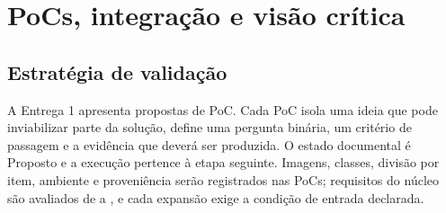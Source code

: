 \chapter{PoCs, integração e visão crítica}

\section{Estratégia de validação}
A Entrega 1 apresenta propostas de PoC. Cada PoC isola uma ideia que pode inviabilizar parte da solução, define uma pergunta binária, um critério de passagem e a evidência que deverá ser produzida. O estado documental é Proposto e a execução pertence à etapa seguinte. Imagens, classes, divisão por item, ambiente e proveniência serão registrados nas PoCs; requisitos do núcleo são avaliados de  a , e cada expansão exige a condição de entrada declarada.

